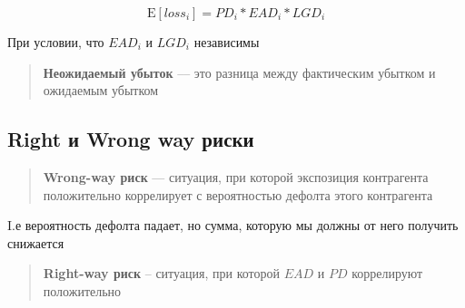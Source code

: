 \documentclass{article}
\begin{document}
            \begin{equation}
                \mathrm{E}[loss_{i}] = PD_{i} * EAD_{i} * LGD_{i}
            \end{equation}

            При условии, что $EAD_{i}$ и $LGD_{i}$ независимы
            \begin{quote}
                \textbf{Неожидаемый убыток} --– это разница между фактическим убытком и ожидаемым убытком
            \end{quote}

        \subsection{Right и Wrong way риски}

            \begin{quote}
                \textbf{Wrong-way риск} --- ситуация, при которой экспозиция контрагента положительно коррелирует с вероятностью дефолта этого контрагента

            \end{quote}

            I.е вероятность дефолта падает, но сумма, которую мы должны от него получить снижается

            \begin{quote}
                \textbf{Right-way риск} -- ситуация, при которой $EAD$ и $PD$ коррелируют положительно
            \end{quote}
\end{document}
